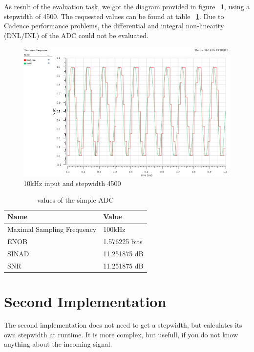 As result of the evaluation task, we got the diagram provided in figure ~\ref{fig:simpleAdcEvaluation}, using a stepwidth of 4500. The requested values can be found at table ~\ref{table:valuesSimpleADC}. Due to Cadence performance problems, the differential and integral non-linearity (DNL/INL) of the ADC could not be evaluated.

\begin{figure}[h]
	\centering
	\includegraphics[scale=0.5]{images/adc/10KHzInputStepWidth4500.png}
	\caption{10kHz input and stepwidth 4500}
	\label{fig:simpleAdcEvaluation}
\end{figure}

\begin{table}[!h]
	\centering
	\begin{tabular}{|l|l|}
		\hline
		Name & Value \\
		\hline
		Maximal Sampling Frequency & 100kHz \\
		ENOB & 1.576225 bits \\
		SINAD & 11.251875 dB \\
		SNR & 11.251875 dB \\
		\hline
	\end{tabular}
	\caption{values of the simple ADC}
	\label{table:valuesSimpleADC}
\end{table}

\section{Second Implementation}

The second implementation does not need to get a stepwidth, but calculates its own stepwidth at runtime. It is more complex, but usefull, if you do not know anything about the incoming signal.

